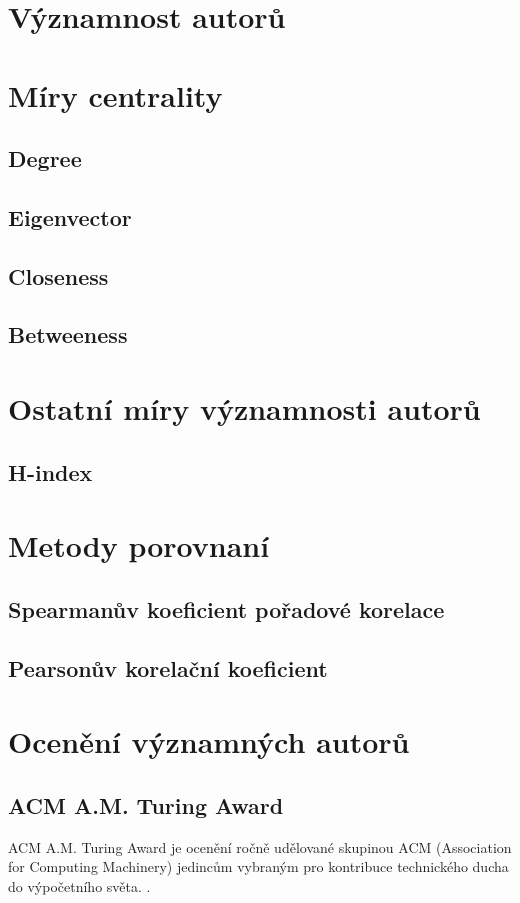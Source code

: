 \documentclass[12pt,titlepage]{report}
\begin{document}
\section{Významnost autorů}

\section{Míry centrality}
\subsection{Degree}
\subsection{Eigenvector}
\subsection{Closeness}
\subsection{Betweeness}

\section{Ostatní míry významnosti autorů}
\subsection{H-index}

\section{Metody porovnaní}
\subsection{Spearmanův koeficient pořadové korelace}
\subsection{Pearsonův korelační koeficient}

\section{Ocenění významných autorů}
\subsection{ACM A.M. Turing Award}
ACM A.M. Turing Award je ocenění ročně udělované skupinou ACM (Association for
Computing Machinery) jedincům vybraným pro kontribuce technického ducha do
výpočetního světa.
\cite{turingaward}.
\end{document}
